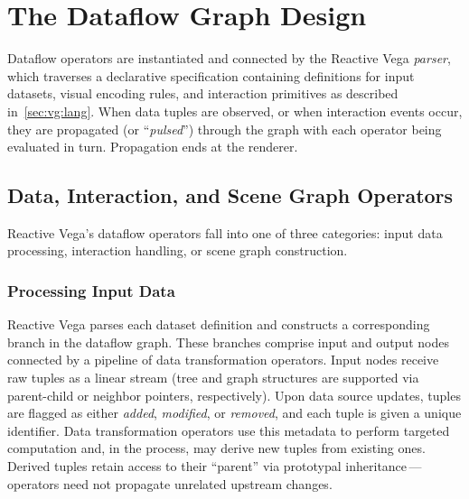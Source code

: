 \section{The Dataflow Graph Design}
\label{sec:vg:dataflow}

\vspace{-10pt}

Dataflow operators are instantiated and connected by the Reactive Vega
\emph{parser}, which traverses a declarative specification containing
definitions for input datasets, visual encoding rules, and interaction
primitives as described in~\cref{sec:vg:lang}. When data tuples are observed, or
when interaction events occur, they are propagated (or ``\emph{pulsed}'')
through the graph with each operator being evaluated in turn. Propagation ends
at the renderer.

\vspace{-20pt}

\subsection{Data, Interaction, and Scene Graph Operators}

\vspace{-7pt}

Reactive Vega's dataflow operators fall into one of three categories: input data
processing, interaction handling, or scene graph construction.

\vspace{-17pt}

\subsubsection{Processing Input Data}

\vspace{-7pt}

Reactive Vega parses each dataset definition and constructs a corresponding
branch in the dataflow graph. These branches comprise input and output nodes
connected by a pipeline of data transformation operators. Input nodes receive
raw tuples as a linear stream (tree and graph structures are supported via
parent-child or neighbor pointers, respectively). Upon data source updates,
tuples are flagged as either \emph{added}, \emph{modified}, or \emph{removed},
and each tuple is given a unique identifier. Data transformation operators use
this metadata to perform targeted computation and, in the process, may derive
new tuples from existing ones. Derived tuples retain access to their ``parent''
via prototypal inheritance\,---\,operators need not propagate unrelated upstream
changes.

